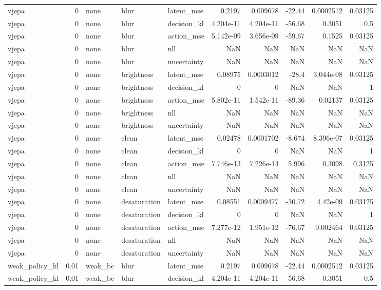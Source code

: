 \begin{tabular}{lrlllrrrrr}
vjepa & 0 & none & blur & latent\_mse & 0.2197 & 0.009678 & -22.44 & 0.0002512 & 0.03125 \\
vjepa & 0 & none & blur & decision\_kl & 4.204e-11 & 4.204e-11 & -56.68 & 0.3051 & 0.5 \\
vjepa & 0 & none & blur & action\_mse & 5.142e-09 & 3.656e-09 & -59.67 & 0.1525 & 0.03125 \\
vjepa & 0 & none & blur & nll & NaN & NaN & NaN & NaN & NaN \\
vjepa & 0 & none & blur & uncertainty & NaN & NaN & NaN & NaN & NaN \\
vjepa & 0 & none & brightness & latent\_mse & 0.08975 & 0.0003012 & -28.4 & 3.044e-08 & 0.03125 \\
vjepa & 0 & none & brightness & decision\_kl & 0 & 0 & NaN & NaN & 1 \\
vjepa & 0 & none & brightness & action\_mse & 5.802e-11 & 1.542e-11 & -89.36 & 0.02137 & 0.03125 \\
vjepa & 0 & none & brightness & nll & NaN & NaN & NaN & NaN & NaN \\
vjepa & 0 & none & brightness & uncertainty & NaN & NaN & NaN & NaN & NaN \\
vjepa & 0 & none & clean & latent\_mse & 0.02478 & 0.0001702 & -8.674 & 8.396e-07 & 0.03125 \\
vjepa & 0 & none & clean & decision\_kl & 0 & 0 & NaN & NaN & 1 \\
vjepa & 0 & none & clean & action\_mse & 7.746e-13 & 7.226e-14 & 5.996 & 0.3098 & 0.3125 \\
vjepa & 0 & none & clean & nll & NaN & NaN & NaN & NaN & NaN \\
vjepa & 0 & none & clean & uncertainty & NaN & NaN & NaN & NaN & NaN \\
vjepa & 0 & none & desaturation & latent\_mse & 0.08551 & 0.0009477 & -30.72 & 4.42e-09 & 0.03125 \\
vjepa & 0 & none & desaturation & decision\_kl & 0 & 0 & NaN & NaN & 1 \\
vjepa & 0 & none & desaturation & action\_mse & 7.277e-12 & 1.951e-12 & -76.67 & 0.002464 & 0.03125 \\
vjepa & 0 & none & desaturation & nll & NaN & NaN & NaN & NaN & NaN \\
vjepa & 0 & none & desaturation & uncertainty & NaN & NaN & NaN & NaN & NaN \\
weak\_policy\_kl & 0.01 & weak\_bc & blur & latent\_mse & 0.2197 & 0.009678 & -22.44 & 0.0002512 & 0.03125 \\
weak\_policy\_kl & 0.01 & weak\_bc & blur & decision\_kl & 4.204e-11 & 4.204e-11 & -56.68 & 0.3051 & 0.5 \\

\end{tabular}
